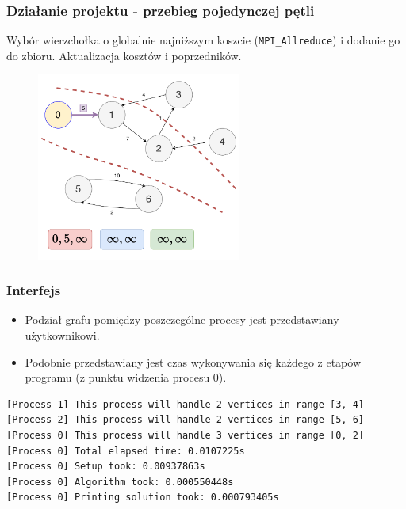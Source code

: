 \documentclass[10pt]{beamer}
\begin{document}
\begin{frame}
\frametitle{Działanie projektu - przebieg pojedynczej pętli}
Wybór wierzchołka o globalnie najniższym koszcie (\lstinline{MPI_Allreduce}) i dodanie go do zbioru. Aktualizacja kosztów i poprzedników.
\begin{figure}
\centering
\includegraphics[width=0.6\textwidth]{static/Algo2.pdf}
\end{figure}
\end{frame}

\begin{frame}[fragile]
\frametitle{Interfejs}
\begin{itemize}
\item Podział grafu pomiędzy poszczególne procesy jest przedstawiany użytkownikowi.
\item Podobnie przedstawiany jest czas wykonywania się każdego z etapów programu (z punktu widzenia procesu 0).
\end{itemize}
\begin{lstlisting}[basicstyle=\tiny]
[Process 1] This process will handle 2 vertices in range [3, 4]
[Process 2] This process will handle 2 vertices in range [5, 6]
[Process 0] This process will handle 3 vertices in range [0, 2]
[Process 0] Total elapsed time: 0.0107225s
[Process 0] Setup took: 0.00937863s
[Process 0] Algorithm took: 0.000550448s
[Process 0] Printing solution took: 0.000793405s
\end{lstlisting}

\end{frame}
\end{document}
